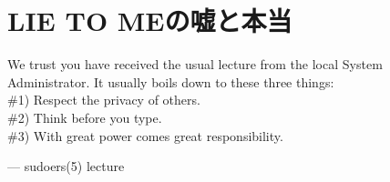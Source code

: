 \chapter{LIE TO MEの嘘と本当}
\epigraph{We trust you have received the usual lecture from the local System Administrator. It usually boils down to these three things:\\
\#1) Respect the privacy of others.\\
\#2) Think before you type.\\
\#3) With great power comes great responsibility.}{--- sudoers(5) lecture}
